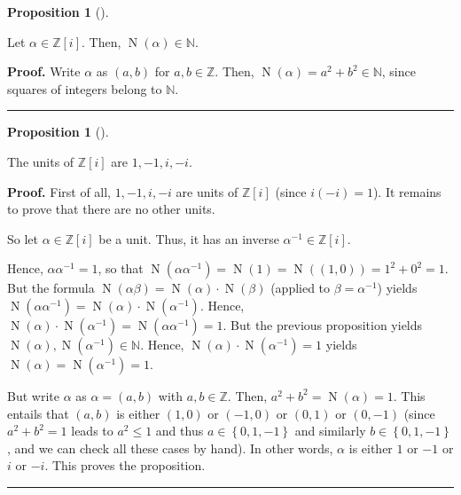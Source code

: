 \documentclass[numbers=enddot,12pt,final,onecolumn,notitlepage]{scrartcl}%
\numberwithin{exer}{subsection}
\theoremstyle{definition}
\newtheorem{prop}[theo]{Proposition}
\newenvironment{proposition}[1][]
{\begin{prop}[#1]\begin{leftbar}}
{\end{leftbar}\end{prop}}
\newenvironment{proof}[1][Proof]{\noindent\textbf{#1.} }{\ \rule{0.5em}{0.5em}}
\begin{document}
\begin{proposition}
\label{prop.Z[i].gauss.Norm-N}Let $\alpha\in\mathbb{Z}\left[  i\right]  $.
Then, $\operatorname*{N}\left(  \alpha\right)  \in\mathbb{N}$.
\end{proposition}

\begin{proof}
Write $\alpha$ as $\left(  a,b\right)  $ for $a,b\in\mathbb{Z}$. Then,
$\operatorname*{N}\left(  \alpha\right)  =a^{2}+b^{2}\in\mathbb{N}$, since
squares of integers belong to $\mathbb{N}$.
\end{proof}

\begin{proposition}
\label{prop.Z[i].gauss.units}The units of $\mathbb{Z}\left[  i\right]  $ are
$1,-1,i,-i$.
\end{proposition}

\begin{proof}
First of all, $1,-1,i,-i$ are units of $\mathbb{Z}\left[  i\right]  $ (since
$i\left(  -i\right)  =1$). It remains to prove that there are no other units.

So let $\alpha\in\mathbb{Z}\left[  i\right]  $ be a unit. Thus, it has an
inverse $\alpha^{-1}\in\mathbb{Z}\left[  i\right]  $.

Hence, $\alpha\alpha^{-1}=1$, so that $\operatorname*{N}\left(  \alpha
\alpha^{-1}\right)  =\operatorname*{N}\left(  1\right)  =\operatorname*{N}%
\left(  \left(  1,0\right)  \right)  =1^{2}+0^{2}=1$. But the formula
$\operatorname*{N}\left(  \alpha\beta\right)  =\operatorname*{N}\left(
\alpha\right)  \cdot\operatorname*{N}\left(  \beta\right)  $ (applied to
$\beta=\alpha^{-1}$) yields $\operatorname*{N}\left(  \alpha\alpha
^{-1}\right)  =\operatorname*{N}\left(  \alpha\right)  \cdot\operatorname*{N}%
\left(  \alpha^{-1}\right)  $. Hence, $\operatorname*{N}\left(  \alpha\right)
\cdot\operatorname*{N}\left(  \alpha^{-1}\right)  =\operatorname*{N}\left(
\alpha\alpha^{-1}\right)  =1$. But the previous proposition yields
$\operatorname*{N}\left(  \alpha\right)  ,\operatorname*{N}\left(  \alpha
^{-1}\right)  \in\mathbb{N}$. Hence, $\operatorname*{N}\left(  \alpha\right)
\cdot\operatorname*{N}\left(  \alpha^{-1}\right)  =1$ yields
$\operatorname*{N}\left(  \alpha\right)  =\operatorname*{N}\left(  \alpha
^{-1}\right)  =1$.

But write $\alpha$ as $\alpha=\left(  a,b\right)  $ with $a,b\in\mathbb{Z}$.
Then, $a^{2}+b^{2}=\operatorname*{N}\left(  \alpha\right)  =1$. This entails
that $\left(  a,b\right)  $ is either $\left(  1,0\right)  $ or $\left(
-1,0\right)  $ or $\left(  0,1\right)  $ or $\left(  0,-1\right)  $ (since
$a^{2}+b^{2}=1$ leads to $a^{2}\leq1$ and thus $a\in\left\{  0,1,-1\right\}  $
and similarly $b\in\left\{  0,1,-1\right\}  $, and we can check all these
cases by hand). In other words, $\alpha$ is either $1$ or $-1$ or $i$ or $-i$.
This proves the proposition.
\end{proof}
\end{document}
